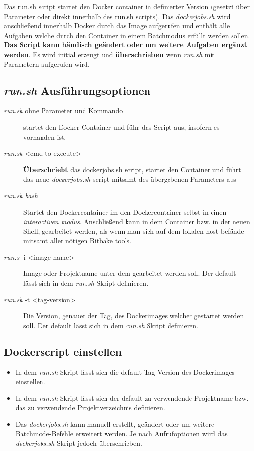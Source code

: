 Das run.sh script startet
den Docker container in definierter Version (gesetzt über Parameter oder direkt
innerhalb des run.sh scripts). Das \textit{dockerjobs.sh} wird anschließend innerhalb Docker durch das
Image aufgerufen und enthält alle Aufgaben welche durch den Container in einem
Batchmodus erfüllt werden sollen.
\textbf{Das Script kann händisch geändert oder um weitere Aufgaben ergänzt
werden}. Es wird initial erzeugt und \textbf{überschrieben} wenn \textit{run.sh}
mit Parametern aufgerufen wird.

\subsection{\textit{run.sh} Ausführungsoptionen}%
\label{sub:textit_run_sh}
\begin{description}
    \item[\textit{run.sh} ohne Parameter und Kommando] startet den Docker Container und führ
        das  Script aus,  insofern es vorhanden ist.
    \item[\textit{run.sh} <cmd-to-execute>] \textbf{Überschriebt} das
        dockerjobs.sh script, startet den Container und führt das neue
        \textit{dockerjobs.sh} script mitsamt des übergebenen Parameters aus
    \item[\textit{run.sh bash}] Startet den Dockercontainer im
        den Dockercontainer selbst in einen \textit{interactiven modus}.
        Anschließend kann in dem Container bzw. in der neuen Shell, gearbeitet
        werden, als wenn man sich auf dem lokalen host befände mitsamt aller
        nötigen Bitbake tools.
    \item[\textit{run.s} -i <image-name>] Image oder Projektname unter dem
        gearbeitet werden soll. Der default lässt sich in dem \textit{run.sh}
        Skript definieren.
    \item[\textit{run.sh} -t <tag-version>] Die Version, genauer der Tag, des
        Dockerimages welcher gestartet werden soll. Der default lässt sich in dem \textit{run.sh} Skript definieren.
\end{description}

\subsection{Dockerscript einstellen}%
\label{sub:dockerscript_einstellen}
\begin{itemize}
    \item In dem \textit{run.sh} Skript lässt sich die default Tag-Version des
        Dockerimages einstellen.
    \item In dem \textit{run.sh} Skript lässt sich der default zu verwendende
        Projektname bzw. das zu verwendende Projektverzeichnis definieren.
    \item Das \textit{dockerjobs.sh} kann manuell erstellt, geändert oder um
        weitere Batchmode-Befehle erweitert werden. Je nach Aufrufoptionen wird
    das \textit{dockerjobs.sh} Skript jedoch überschrieben.
\end{itemize}






